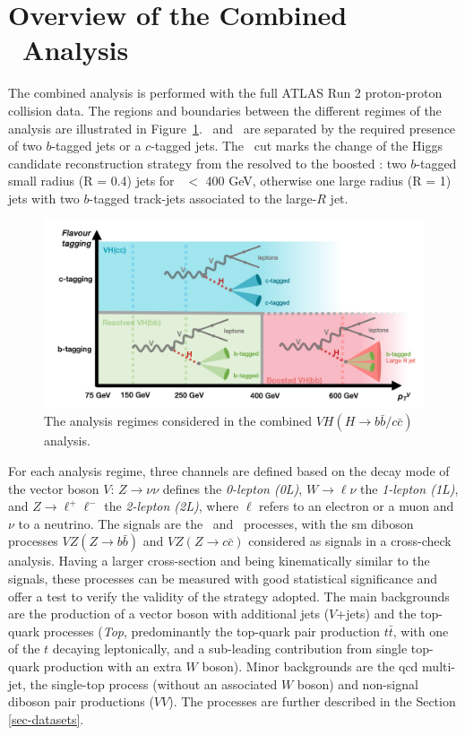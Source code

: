 \section[Overview of the Combined \vhbc\ Analysis]{Overview of the Combined \boldvhbc\ Analysis}
The combined analysis is performed with the full ATLAS Run 2 proton-proton collision data. The regions and boundaries between the different regimes of the analysis are illustrated in Figure~\ref{fig:ana-strat}. \vhb\ and \vhc\ are separated by the required presence of two $b$-tagged jets or a $c$-tagged jets. The \ptv\ cut marks the change of the Higgs candidate reconstruction strategy from the resolved to the boosted \vhb: two $b$-tagged small radius (R = 0.4) jets for \ptv\ $<$ 400 GeV, otherwise one large radius (R = 1) jets with two $b$-tagged track-jets associated to the large-$R$ jet.

\begin{figure}[h!]
\center
\includegraphics[width=\textwidth]{Images/VH/Cat/AnalysisRegime.png}
\caption{The analysis regimes considered in the combined $VH (H\rightarrow b\bar{b}/c\bar{c})$ analysis.} 
\label{fig:ana-strat}
\end{figure}

For each analysis regime, three channels are defined based on the decay mode of the vector boson $V$: $Z \rightarrow \nu \nu$ defines the \textit{0-lepton (0L)}, $W \rightarrow \ell \nu $ the \textit{1-lepton (1L)}, and $Z \rightarrow\ell^+\ell^-$ the \textit{2-lepton (2L)}, where $\ell$ refers to an electron or a muon and $\nu$ to a neutrino. The signals are the \vhb\ and \vhc\ processes, with the \gls{sm} diboson processes $VZ (Z\rightarrow b\bar{b})$ and $VZ (Z\rightarrow c\bar{c})$ considered as signals in a cross-check analysis. Having a larger cross-section and being kinematically similar to the signals, these processes can be measured with good statistical significance and offer a test to verify the validity of the strategy adopted. The main backgrounds are the production of a vector boson with additional jets ($V$+jets) and the top-quark processes (\textit{Top}, predominantly the top-quark pair production $t\bar{t}$, with one of the $t$ decaying leptonically, and a sub-leading contribution from single top-quark production with an extra $W$ boson). Minor backgrounds are the \gls{qcd} multi-jet, the single-top process (without an associated $W$ boson) and non-signal diboson pair productions ($VV$). The processes are further described in the Section \ref{sec-datasets}. \\ 

